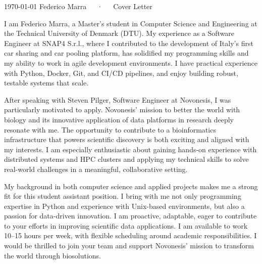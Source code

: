 \documentclass[11pt, a4paper]{awesome-cv}
\begin{document}
\makecvheader[R]

\makecvfooter
  {\today}
  {Federico Marra~~~·~~~Cover Letter}
  {}

\makelettertitle

\begin{cvletter}

I am Federico Marra, a Master’s student in Computer Science and Engineering at the Technical University of Denmark (DTU). My experience as a Software Engineer at SNAP4 S.r.l., where I contributed to the development of Italy’s first car sharing and car pooling platform, has solidified my programming skills and my ability to work in agile development environments. I have practical experience with Python, Docker, Git, and CI/CD pipelines, and enjoy building robust, testable systems that scale.

After speaking with Steven Pilger, Software Engineer at Novonesis, I was particularly motivated to apply. Novonesis' mission to better the world with biology and its innovative application of data platforms in research deeply resonate with me. The opportunity to contribute to a bioinformatics infrastructure that powers scientific discovery is both exciting and aligned with my interests. I am especially enthusiastic about gaining hands-on experience with distributed systems and HPC clusters and applying my technical skills to solve real-world challenges in a meaningful, collaborative setting.

My background in both computer science and applied projects makes me a strong fit for this student assistant position. I bring with me not only programming expertise in Python and experience with Unix-based environments, but also a passion for data-driven innovation. I am proactive, adaptable, eager to contribute to your efforts in improving scientific data applications. I am available to work 10–15 hours per week, with flexible scheduling around academic responsibilities. I would be thrilled to join your team and support Novonesis’ mission to transform the world through biosolutions.

\end{cvletter}

\makeletterclosing
\end{document}
